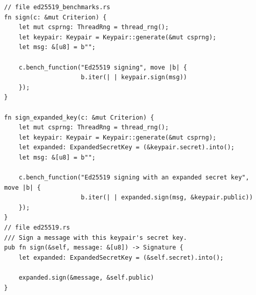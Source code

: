 \begin{lstlisting}[caption = sign \& sign with expanded secret key in ed25519-dalek, label=lst-ed25519dalek2sign]
// file ed25519_benchmarks.rs
fn sign(c: &mut Criterion) {
    let mut csprng: ThreadRng = thread_rng();
    let keypair: Keypair = Keypair::generate(&mut csprng);
    let msg: &[u8] = b"";

    c.bench_function("Ed25519 signing", move |b| {
                     b.iter(| | keypair.sign(msg))
    });
}

fn sign_expanded_key(c: &mut Criterion) {
    let mut csprng: ThreadRng = thread_rng();
    let keypair: Keypair = Keypair::generate(&mut csprng);
    let expanded: ExpandedSecretKey = (&keypair.secret).into();
    let msg: &[u8] = b"";
    
    c.bench_function("Ed25519 signing with an expanded secret key", move |b| {
                     b.iter(| | expanded.sign(msg, &keypair.public))
    });
}
// file ed25519.rs
/// Sign a message with this keypair's secret key.
pub fn sign(&self, message: &[u8]) -> Signature {
    let expanded: ExpandedSecretKey = (&self.secret).into();

    expanded.sign(&message, &self.public)
}
\end{lstlisting}